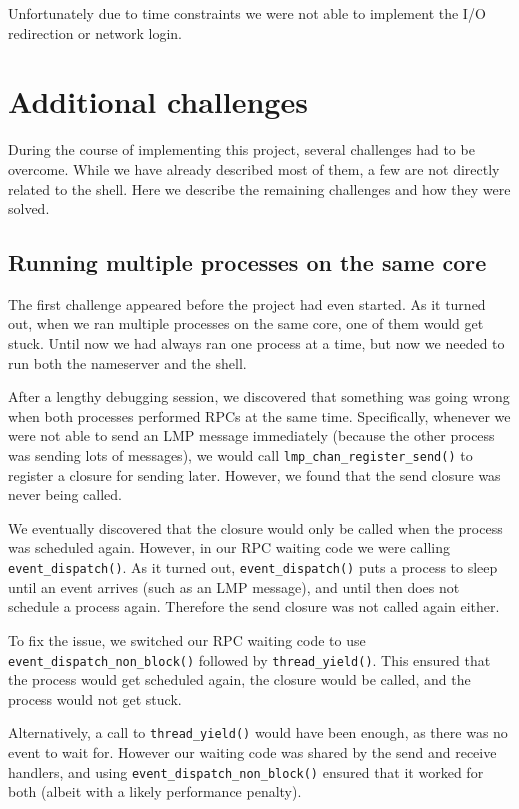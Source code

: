 Unfortunately due to time constraints we were not able to implement the I/O redirection or network login.


\section{Additional challenges}

During the course of implementing this project, several challenges had to be overcome.
While we have already described most of them, a few are not directly related to the shell.
Here we describe the remaining challenges and how they were solved.

\subsection{Running multiple processes on the same core}

The first challenge appeared before the project had even started.
As it turned out, when we ran multiple processes on the same core, one of them would get stuck.
Until now we had always ran one process at a time, but now we needed to run both the nameserver and the shell.

After a lengthy debugging session, we discovered that something was going wrong when both processes performed RPCs at the same time.
Specifically, whenever we were not able to send an LMP message immediately (because the other process was sending lots of messages), we would call \verb|lmp_chan_register_send()| to register a closure for sending later.
However, we found that the send closure was never being called.

We eventually discovered that the closure would only be called when the process was scheduled again.
However, in our RPC waiting code we were calling \verb|event_dispatch()|.
As it turned out, \verb|event_dispatch()| puts a process to sleep until an event arrives (such as an LMP message), and until then does not schedule a process again.
Therefore the send closure was not called again either.

To fix the issue, we switched our RPC waiting code to use 
\newline \verb|event_dispatch_non_block()| followed by \verb|thread_yield()|.
This ensured that the process would get scheduled again, the closure would be called, and the process would not get stuck.

Alternatively, a call to \verb|thread_yield()| would have been enough, as there was no event to wait for.
However our waiting code was shared by the send and receive handlers, and using \verb|event_dispatch_non_block()| ensured that it worked for both (albeit with a likely performance penalty).

